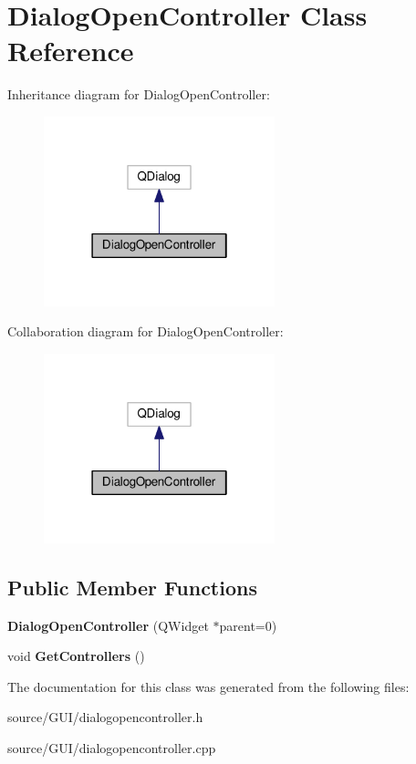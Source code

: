 \section{Dialog\+Open\+Controller Class Reference}
\label{class_dialog_open_controller}


Inheritance diagram for Dialog\+Open\+Controller\+:\nopagebreak
\begin{figure}[H]
\begin{center}
\leavevmode
\includegraphics[width=190pt]{class_dialog_open_controller__inherit__graph}
\end{center}
\end{figure}


Collaboration diagram for Dialog\+Open\+Controller\+:\nopagebreak
\begin{figure}[H]
\begin{center}
\leavevmode
\includegraphics[width=190pt]{class_dialog_open_controller__coll__graph}
\end{center}
\end{figure}
\subsection*{Public Member Functions}
\begin{DoxyCompactItemize}
\item 
{\bfseries Dialog\+Open\+Controller} (Q\+Widget $\ast$parent=0)\label{class_dialog_open_controller_a905e6f5cd4c7a2e8758683e870c1d545}

\item 
void {\bfseries Get\+Controllers} ()\label{class_dialog_open_controller_a1ce82310005e39232266fa50297647b1}

\end{DoxyCompactItemize}


The documentation for this class was generated from the following files\+:\begin{DoxyCompactItemize}
\item 
source/\+G\+U\+I/dialogopencontroller.\+h\item 
source/\+G\+U\+I/dialogopencontroller.\+cpp\end{DoxyCompactItemize}

